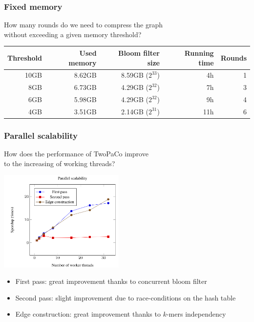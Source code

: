 \begin{frame}
	\frametitle{Fixed memory}
	\centering
	
	How many rounds do we need to compress the graph\\ without exceeding a given memory threshold?
	
	\bigskip
	
	\begin{tabular}{ | r | r | r | r | r | }
  \hline
  Threshold  & Used memory & Bloom filter size & Running time & Rounds \\ \hline
        10GB &      8.62GB &       8.59GB ($2^{33}$) &           4h &      1 \\
         8GB &      6.73GB &       4.29GB ($2^{32}$) &           7h &      3 \\
         6GB &      5.98GB &       4.29GB ($2^{32}$) &           9h &      4 \\
         4GB &      3.51GB &       2.14GB ($2^{31}$) &          11h &      6 \\
  \hline
  \end{tabular}

\end{frame}


\begin{frame}
	\frametitle{Parallel scalability}
	\centering
	
	How does the performance of TwoPaCo improve \\to the increasing of working threads?
	 
	\includegraphics[height=5cm]{images/scalability}
	
	\begin{itemize}
	  \item First pass: great improvement thanks to concurrent bloom filter
	  \item Second pass: slight improvement due to race-conditions on the hash table
	  \item Edge construction: great improvement thanks to $k$-mers independency
	\end{itemize}
\end{frame}

